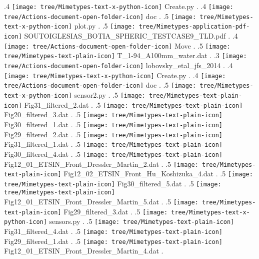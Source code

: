 {.4 { \texttt{[image: tree/Mimetypes-text-x-python-icon]} Create.py }.
.4 { \texttt{[image: tree/Actions-document-open-folder-icon]} doc }.
.5 { \texttt{[image: tree/Mimetypes-text-x-python-icon]} plot.py }.
.5 { \texttt{[image: tree/Mimetypes-application-pdf-icon]} SOUTOIGLESIAS\_BOTIA\_SPHERIC\_TESTCASE9\_TLD.pdf }.
.4 { \texttt{[image: tree/Actions-document-open-folder-icon]} Move }.
.5 { \texttt{[image: tree/Mimetypes-text-plain-icon]} T\_1-94\_A100mm\_water.dat }.
.3 { \texttt{[image: tree/Actions-document-open-folder-icon]} lobovsky\_etal\_jfs\_2014 }.
.4 { \texttt{[image: tree/Mimetypes-text-x-python-icon]} Create.py }.
.4 { \texttt{[image: tree/Actions-document-open-folder-icon]} doc }.
.5 { \texttt{[image: tree/Mimetypes-text-x-python-icon]} sensor2.py }.
.5 { \texttt{[image: tree/Mimetypes-text-plain-icon]} Fig31\_filtered\_2.dat }.
.5 { \texttt{[image: tree/Mimetypes-text-plain-icon]} Fig20\_filtered\_3.dat }.
.5 { \texttt{[image: tree/Mimetypes-text-plain-icon]} Fig30\_filtered\_1.dat }.
.5 { \texttt{[image: tree/Mimetypes-text-plain-icon]} Fig29\_filtered\_2.dat }.
.5 { \texttt{[image: tree/Mimetypes-text-plain-icon]} Fig31\_filtered\_1.dat }.
.5 { \texttt{[image: tree/Mimetypes-text-plain-icon]} Fig30\_filtered\_4.dat }.
.5 { \texttt{[image: tree/Mimetypes-text-plain-icon]} Fig12\_01\_ETSIN\_Front\_Dressler\_Martin\_2.dat }.
.5 { \texttt{[image: tree/Mimetypes-text-plain-icon]} Fig12\_02\_ETSIN\_Front\_Hu\_Koshizuka\_4.dat }.
.5 { \texttt{[image: tree/Mimetypes-text-plain-icon]} Fig30\_filtered\_5.dat }.
.5 { \texttt{[image: tree/Mimetypes-text-plain-icon]} Fig12\_01\_ETSIN\_Front\_Dressler\_Martin\_5.dat }.
.5 { \texttt{[image: tree/Mimetypes-text-plain-icon]} Fig29\_filtered\_3.dat }.
.5 { \texttt{[image: tree/Mimetypes-text-x-python-icon]} sensors.py }.
.5 { \texttt{[image: tree/Mimetypes-text-plain-icon]} Fig31\_filtered\_4.dat }.
.5 { \texttt{[image: tree/Mimetypes-text-plain-icon]} Fig29\_filtered\_1.dat }.
.5 { \texttt{[image: tree/Mimetypes-text-plain-icon]} Fig12\_01\_ETSIN\_Front\_Dressler\_Martin\_4.dat }.
}
